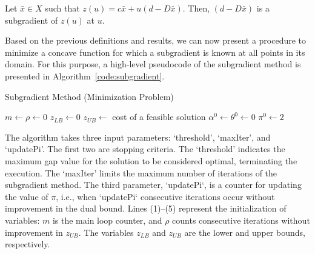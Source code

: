 \begin{proposition}
	Let $\bar{x} \in X$ such that $z(u) = c \bar{x} + u(d - D\bar{x})$. Then, $(d - D\bar{x})$ is a subgradient of $z(u)$ at $u$.
\end{proposition}

Based on the previous definitions and results, we can now present a procedure to
minimize a concave function for which a subgradient is known at all points in
its domain. For this purpose, a high-level pseudocode of the subgradient method
is presented in Algorithm~\ref{code:subgradient}.

\begin{algorithm}[!ht]
	\caption{\label{code:subgradient} Subgradient Method (Minimization Problem)}
	$m \leftarrow \rho \leftarrow 0$\;
	$z_{LB} \leftarrow 0$\;
	$z_{UB} \leftarrow$ cost of a feasible solution\;
	$\alpha^{0} \leftarrow \theta^{0} \leftarrow 0$\; $\pi^{0} \leftarrow 2$\;
	
\end{algorithm}

The algorithm takes three input parameters: `threshold', `maxIter', and
`updatePi'. The first two are stopping criteria. The `threshold' indicates the
maximum gap value for the solution to be considered optimal, terminating the
execution. The `maxIter' limits the maximum number of iterations of the
subgradient method. The third parameter, `updatePi`, is a counter for updating
the value of $\pi$, i.e., when `updatePi` consecutive iterations occur without
improvement in the dual bound. Lines (1)–(5) represent the initialization of
variables: $m$ is the main loop counter, and $\rho$ counts consecutive
iterations without improvement in $z_{UB}$. The variables $z_{LB}$ and $z_{UB}$
are the lower and upper bounds, respectively. 

